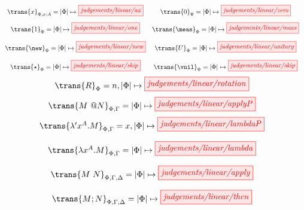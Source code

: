 \begin{table}\small
    \[
    \begin{array}{c c}
        \trans{x}_{\Phi,x:A} = |\Phi|\mapsto \tikzfig{judgements/linear/ax}
        &
        \trans{0}_{\Phi} = |\Phi|\mapsto\tikzfig{judgements/linear/zero}
        \\[10pt]
        \trans{1}_{\Phi} = |\Phi|\mapsto\tikzfig{judgements/linear/one}
        &
        \trans{\meas}_{\Phi} = |\Phi|\mapsto\tikzfig{judgements/linear/meas}
        \\[12pt]
        \trans{\new}_{\Phi} = |\Phi|\mapsto\tikzfig{judgements/linear/new}
        &
        \trans{U}_{\Phi} = |\Phi|\mapsto\tikzfig{judgements/linear/unitary}
        \\[12pt]
        \trans{\star}_\Phi = |\Phi|\mapsto\tikzfig{judgements/linear/skip}
        &
        \trans{\vnil}_\Phi = |\Phi|\mapsto\tikzfig{judgements/linear/skip}
    \end{array}
    \]
    \[
        \begin{array}{c}
            \trans{R}_{\Phi} = n,|\Phi|\mapsto\tikzfig{judgements/linear/rotation}\\[7pt]
            \trans{M\ @N}_{\Phi,\Gamma} = |\Phi|\mapsto \tikzfig{judgements/linear/applyP}\\[7pt]
            \trans{\lambda' x^A . M}_{\Phi,\Gamma} = x,|\Phi| \mapsto \tikzfig{judgements/linear/lambdaP}
            \\[12pt]
            \trans{\lambda x^A . M}_{\Phi,\Gamma} = |\Phi| \mapsto \tikzfig{judgements/linear/lambda}
            \\[12pt]
            \trans{M\ N}_{\Phi,\Gamma,\Delta} = |\Phi|\mapsto \tikzfig{judgements/linear/apply}
            \\[12pt]
            \trans{M; N}_{\Phi, \Gamma, \Delta} = |\Phi|\mapsto \tikzfig{judgements/linear/then}
        \end{array}
    \]
    \caption{State translation}
    \label{tab:TermTrans}
\end{table}

